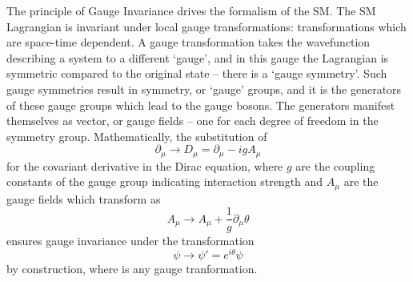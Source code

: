 The principle of Gauge Invariance drives the formalism of the \ac{SM}. 
The \ac{SM} Lagrangian is invariant under local gauge transformations: transformations which are space-time dependent.
A gauge transformation takes the wavefunction describing a system to a different `gauge', and in this gauge the Lagrangian is symmetric compared to the original state -- there is a `gauge symmetry'.
Such gauge symmetries result in symmetry, or `gauge' groups, and it is the generators of these gauge groups which lead to the gauge bosons.
The generators manifest themselves as vector, or gauge fields -- one for each degree of freedom in the symmetry group. 
Mathematically, the substitution of 
\begin{equation}
\partial_{\mu} \rightarrow D_{\mu} = \partial_{\mu} - i g A_{\mu}
\label{eq:covariant}
\end{equation}
for the covariant derivative in the Dirac equation, where $g$ are the coupling constants of the gauge group indicating interaction strength and $A_{\mu}$ are the gauge fields which transform as
\begin{equation}
A_{\mu} \rightarrow A_{\mu} + \frac{1}{g}\partial_{\mu}\theta
\label{Amugaugetransform}
\end{equation}
 ensures gauge invariance under the transformation
\begin{equation}
\psi \rightarrow \psi' = e^{i \theta} \psi
\label{u1gaugetransform}
\end{equation}
by construction, where \theta is any gauge tranformation.


